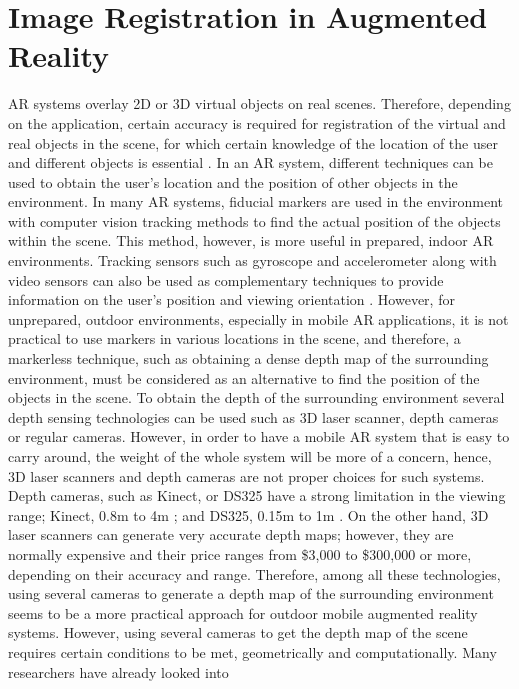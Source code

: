 \section{Image Registration in Augmented Reality}
AR systems overlay 2D or 3D virtual objects on real scenes. Therefore, depending on the application, certain accuracy is required for 
registration of the virtual and real objects in the scene, for which certain knowledge of the location of the user and different objects 
is essential \cite{azuma01}.
In an AR system, different techniques can be used to 
obtain the user's location and the position of other objects in the environment. In many AR systems, fiducial markers are used
in the environment with computer vision tracking methods to find the actual position of the objects within the scene. This method, however, is 
more useful in prepared, indoor AR environments. Tracking sensors such as gyroscope and accelerometer along with video sensors can 
also be used as complementary techniques to provide information on the user's position and viewing orientation \cite{azuma01}. 
However, for unprepared, outdoor environments, especially in mobile AR applications, it is not practical to use markers in various locations 
in the scene, 
and therefore, a markerless technique, such as obtaining a dense depth map of the surrounding environment,
must be considered as an alternative to find the position of the objects in the scene.
To obtain the depth of the 
surrounding environment several depth sensing technologies can be used such as 3D laser scanner, depth cameras or regular cameras. However, in order to have a mobile AR
system that is easy to carry around, the weight of the whole system will be more of a concern, hence, 
3D laser scanners and depth cameras are not proper choices for such systems.
Depth cameras, such as Kinect, or DS325 have a strong limitation in the viewing range; Kinect, 0.8m to 4m \cite{mkinect}; and DS325, 0.15m to 1m \cite{skinetic}. 
On the other hand, 3D laser scanners can
generate very accurate depth maps; however, they are normally expensive and their price ranges from \$3,000 to \$300,000 or more, 
depending on their accuracy and range.
Therefore, among all these technologies, using several 
cameras to generate a depth map of the surrounding environment seems to be a more practical approach for outdoor mobile augmented reality systems. {\newline}
However, using several cameras to get the depth map of the scene requires certain conditions to be met, geometrically and computationally. Many researchers have already looked into
